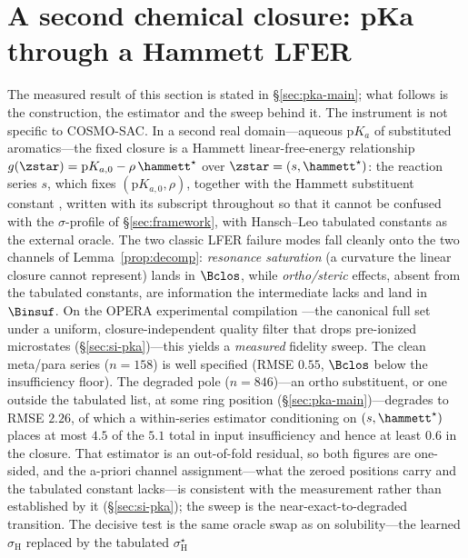 \section{A second chemical closure: pKa through a Hammett LFER}
\label{sec:pka}
The measured result of this section is stated in \S\ref{sec:pka-main}; what follows is the
construction, the estimator and the sweep behind it.
The instrument is not specific to COSMO-SAC. In a second real domain---aqueous $\mathrm pK_a$ of
substituted aromatics---the fixed closure is a Hammett linear-free-energy relationship
$g(\zstar)=\mathrm pK_{a,0}-\rho\,\hammett^\star$ over $\zstar=(s,\hammett^\star)$: the reaction series $s$,
which fixes $(\mathrm pK_{a,0},\rho)$, together with the Hammett substituent constant \hammett,
written with its subscript throughout so that it cannot be confused with the $\sigma$-profile of
\S\ref{sec:framework}, with Hansch--Leo tabulated constants as the
external oracle. The two classic LFER failure modes fall cleanly onto the two channels of
Lemma~\ref{prop:decomp}: \emph{resonance saturation} (a curvature the linear closure cannot
represent) lands in $\Bclos$, while \emph{ortho/steric} effects, absent from the tabulated
constants, are information the intermediate lacks and land in $\Binsuf$. On the OPERA experimental
compilation \cite{mansouri2019opera}---the canonical full set under a uniform, closure-independent
quality filter that drops pre-ionized microstates (\S\ref{sec:si-pka})---this yields a
\emph{measured} fidelity sweep. The clean meta/para series ($n{=}158$) is well specified (RMSE $0.55$,
$\Bclos$ below the insufficiency floor). The degraded pole ($n{=}846$)---an ortho substituent, or one outside the tabulated
list, at some ring position (\S\ref{sec:pka-main})---degrades to
RMSE $2.26$, of which a within-series estimator conditioning on $(s,\hammett^\star)$ places at most $4.5$
of the $5.1$ total in input insufficiency and hence at least $0.6$ in the closure. That estimator is an out-of-fold residual, so
both figures are one-sided, and the a-priori
channel assignment---what the zeroed positions carry and the tabulated constant lacks---is consistent with the
measurement rather than established by it (\S\ref{sec:si-pka}); the sweep is the
near-exact-to-degraded transition. The decisive test is the
same oracle swap as on solubility---the learned $\hat\sigma_{\mathrm H}$ replaced by the tabulated $\sigma_{\mathrm H}^\star$
